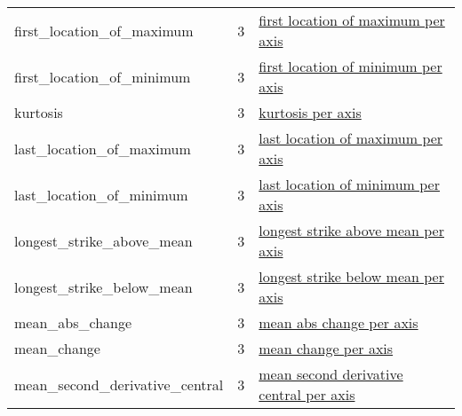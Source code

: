 \begin{table}[h]
{\begin{tabular}{|l|c|l|}
			first\_location\_of\_maximum & 3 & \href{https://tsfresh.readthedocs.io/en/latest/api/tsfresh.feature_extraction.html\#tsfresh.feature_extraction.feature_calculators.first_location_of_maximum}{first location of maximum per axis}\\
			first\_location\_of\_minimum & 3 & \href{https://tsfresh.readthedocs.io/en/latest/api/tsfresh.feature_extraction.html\#tsfresh.feature_extraction.feature_calculators.first_location_of_minimum}{first location of minimum per axis}\\
			kurtosis & 3 & \href{https://tsfresh.readthedocs.io/en/latest/api/tsfresh.feature_extraction.html\#tsfresh.feature_extraction.feature_calculators.kurtosis}{kurtosis per axis}\\
			last\_location\_of\_maximum & 3 & \href{https://tsfresh.readthedocs.io/en/latest/api/tsfresh.feature_extraction.html\#tsfresh.feature_extraction.feature_calculators.last_location_of_maximum}{last location of maximum per axis}\\
			last\_location\_of\_minimum & 3 & \href{https://tsfresh.readthedocs.io/en/latest/api/tsfresh.feature_extraction.html\#tsfresh.feature_extraction.feature_calculators.last_location_of_minimum}{last location of minimum per axis}\\
			longest\_strike\_above\_mean & 3 & \href{https://tsfresh.readthedocs.io/en/latest/api/tsfresh.feature_extraction.html\#tsfresh.feature_extraction.feature_calculators.longest_strike_above_mean}{longest strike above mean per axis}\\
			longest\_strike\_below\_mean & 3 & \href{https://tsfresh.readthedocs.io/en/latest/api/tsfresh.feature_extraction.html\#tsfresh.feature_extraction.feature_calculators.longest_strike_below_mean}{longest strike below mean per axis}\\
			mean\_abs\_change & 3 & \href{https://tsfresh.readthedocs.io/en/latest/api/tsfresh.feature_extraction.html\#tsfresh.feature_extraction.feature_calculators.mean_abs_change}{mean abs change per axis}\\
			mean\_change & 3 & \href{https://tsfresh.readthedocs.io/en/latest/api/tsfresh.feature_extraction.html\#tsfresh.feature_extraction.feature_calculators.mean_change}{mean change per axis}\\
			mean\_second\_derivative\_central & 3 & \href{https://tsfresh.readthedocs.io/en/latest/api/tsfresh.feature_extraction.html\#tsfresh.feature_extraction.feature_calculators.mean_second_derivative_central}{mean second derivative central per axis}\\

\end{tabular}}
\end{table}
